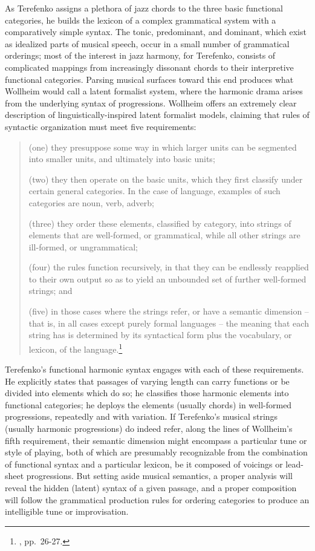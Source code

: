 As Terefenko assigns a plethora of jazz chords to the three basic functional categories, he builds the lexicon of a complex grammatical system with a comparatively simple syntax.  The tonic, predominant, and dominant, which exist as idealized parts of musical speech, occur in a small number of grammatical orderings; most of the interest in jazz harmony, for Terefenko, consists of complicated mappings from increasingly dissonant chords to their interpretive functional categories.  Parsing musical surfaces toward this end produces what Wollheim would call a latent formalist system, where the harmonic drama arises from the underlying syntax of progressions.  Wollheim offers an extremely clear description of linguistically-inspired latent formalist models, claiming that rules of syntactic organization must meet five requirements:
\begin{quote}
(one) they presuppose some way in which larger units can be segmented into smaller units, and ultimately into basic units;

(two) they then operate on the basic units, which they first classify under certain general categories.  In the case of language, examples of such categories are noun, verb, adverb;

(three) they order these elements, classified by category, into strings of elements that are well-formed, or grammatical, while all other strings are ill-formed, or ungrammatical;

(four) the rules function recursively, in that they can be endlessly reapplied to their own output so as to yield an unbounded set of further well-formed strings; and

(five) in those cases where the strings refer, or have a semantic dimension -- that is, in all cases except purely formal languages -- the meaning that each string has is determined by its syntactical form plus the vocabulary, or lexicon, of the language.\footnote{\cite{wollheim1995}, pp.\ 26-27.}
\end{quote}
Terefenko's functional harmonic syntax engages with each of these requirements.  He explicitly states that passages of varying length can carry functions or be divided into elements which do so; he classifies those harmonic elements into functional categories; he deploys the elements (usually chords) in well-formed progressions, repeatedly and with variation.  If Terefenko's musical strings (usually harmonic progressions) do indeed refer, along the lines of Wollheim's fifth requirement, their semantic dimension might encompass a particular tune or style of playing, both of which are presumably recognizable from the combination of functional syntax and a particular lexicon, be it composed of voicings or lead-sheet progressions.  But setting aside musical semantics, a proper analysis will reveal the hidden (latent) syntax of a given passage, and a proper composition will follow the grammatical production rules for ordering categories to produce an intelligible tune or improvisation.

